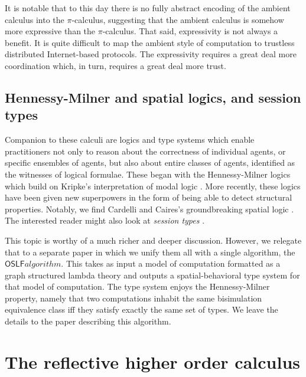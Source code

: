 It is notable that to this day there is no fully abstract encoding of
the ambient calculus into the $\pi$-calculus, suggesting that the
ambient calculus is somehow more expressive than the
$\pi$-calculus. That said, expressivity is not always a benefit. It is
quite difficult to map the ambient style of computation to trustless
distributed Internet-based protocols. The expressivity requires a
great deal more coordination which, in turn, requires a great deal
more trust.

\subsection{Hennessy-Milner and spatial logics, and session types}

Companion to these calculi are logics and type systems which enable
practitioners not only to reason about the correctness of individual
agents, or specific ensembles of agents, but also about entire classes
of agents, identified as the witnesses of logical formulae. These
began with the Hennessy-Milner logics which build on Kripke's
interpretation of modal logic \cite{milner91polyadicpi}. More
recently, these logics have been given new superpowers in the form of
being able to detect structural properties. Notably, we find Cardelli
and Caires's groundbreaking spatial logic
\cite{DBLP:conf/fossacs/Caires04} \cite{DBLP:journals/iandc/CairesC03}
\cite{DBLP:journals/tcs/CairesC04}. The interested reader might also
look at \emph{session types}
\cite{DBLP:conf/wsfm/Dezani-Ciancaglinid09}.

This topic is worthy of a much richer and deeper discussion. However,
we relegate that to a separate paper in which we unify them all with a
single algorithm, the $\mathsf{OSLF} algorithm$. This takes as input a
model of computation formatted as a graph structured lambda theory and
outputs a spatial-behavioral type system for that model of
computation. The type system enjoys the Hennessy-Milner property,
namely that two computations inhabit the same bisimulation equivalence
class iff they satisfy exactly the same set of types. We leave the
details to the paper describing this algorithm.

\section{The reflective higher order calculus}

